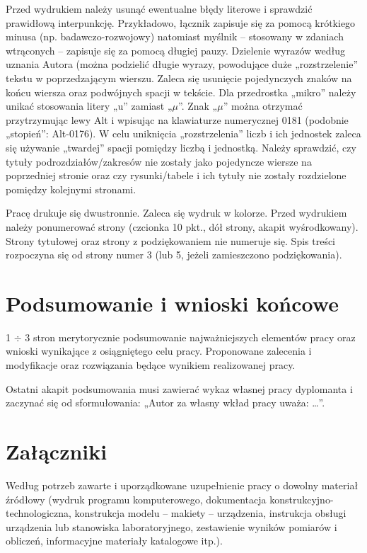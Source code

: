 \documentclass[12pt,twoside]{mwart}
\begin{document}
Przed wydrukiem należy usunąć ewentualne błędy literowe i sprawdzić prawidłową
interpunkcję. Przykładowo, łącznik zapisuje się za pomocą krótkiego minusa (np.
badawczo-rozwojowy) natomiast myślnik -- stosowany w zdaniach wtrąconych -- zapisuje
się za pomocą długiej pauzy. Dzielenie wyrazów według uznania Autora (można podzielić
długie wyrazy, powodujące duże „rozstrzelenie” tekstu w poprzedzającym wierszu. Zaleca się usunięcie pojedynczych znaków na końcu wiersza oraz podwójnych spacji w tekście.
Dla przedrostka „mikro” należy unikać stosowania litery „u” zamiast „$\mu$”. Znak „$\mu$” można
otrzymać przytrzymując lewy Alt i wpisując na klawiaturze numerycznej 0181 (podobnie
„stopień”: Alt-0176). W celu uniknięcia „rozstrzelenia” liczb i ich jednostek zaleca się
używanie „twardej” spacji pomiędzy liczbą i jednostką. Należy sprawdzić, czy tytuły
podrozdziałów/zakresów nie zostały jako pojedyncze wiersze na poprzedniej stronie oraz
czy rysunki/tabele i ich tytuły nie zostały rozdzielone pomiędzy kolejnymi stronami.

Pracę drukuje się dwustronnie. Zaleca się wydruk w kolorze. Przed wydrukiem
należy ponumerować strony (czcionka 10 pkt., dół strony, akapit wyśrodkowany). Strony
tytułowej oraz strony z podziękowaniem nie numeruje się. Spis treści rozpoczyna się od
strony numer 3 (lub 5, jeżeli zamieszczono podziękowania).

\clearpage

\section{Podsumowanie i wnioski końcowe}

1 $\div$ 3 stron merytorycznie podsumowanie najważniejszych elementów pracy oraz wnioski wynikające z osiągniętego celu pracy. Proponowane zalecenia i modyfikacje oraz rozwiązania będące wynikiem realizowanej pracy.

Ostatni akapit podsumowania musi zawierać wykaz własnej pracy dyplomanta i zaczynać się od sformułowania: „Autor za własny wkład pracy uważa: \ldots”.

\clearpage

\section*{Załączniki}

Według potrzeb zawarte i uporządkowane uzupełnienie pracy o dowolny materiał źródłowy (wydruk programu komputerowego, dokumentacja kons\-truk\-cyj\-no-\-tech\-no\-lo\-gicz\-na, konstrukcja modelu -- makiety -- urządzenia, instrukcja obsługi urządzenia lub stanowiska laboratoryjnego, zestawienie wyników pomiarów i obliczeń, informacyjne materiały katalogowe itp.).
\end{document}
